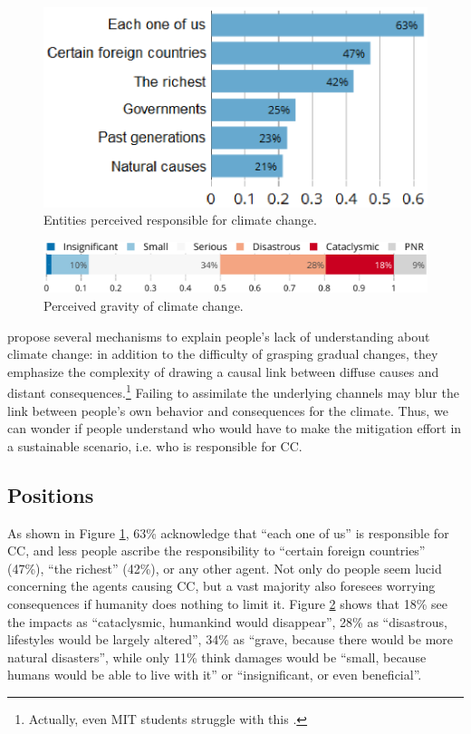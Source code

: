\documentclass[english,5p,authoryear]{elsarticle}
\begin{document}


\begin{figure}[!htbp]
\centering
\includegraphics[width=0.75\columnwidth]{Images_EPS/CC_responsiblec.eps}
\caption{Entities perceived responsible for climate change.}
\label{fig:responsible}
\end{figure}

\begin{figure}[t]
\centering
\includegraphics[width=\columnwidth]{Images_EPS/CC_effects_nolegend.eps}
\caption{Perceived gravity of climate change.}
\label{fig:gravity}
\end{figure}

\citet{millner_beliefs_2016} propose several mechanisms to explain people's lack of understanding about climate change: in addition to the difficulty of grasping gradual changes, they emphasize the complexity of drawing a causal link between diffuse causes and distant consequences.\footnote{Actually, even MIT students struggle with this \citep{sterman_risk_2008}.} Failing to assimilate the underlying channels may blur the link between people's own behavior and consequences for the climate. Thus, we can wonder if people understand who would have to make the mitigation effort in a sustainable scenario, i.e. who is responsible for CC.


    \subsection{Positions\label{subsec:opinions}}
As shown in Figure \ref{fig:responsible}, 63\% acknowledge that ``each one of us'' is responsible for CC, and less people ascribe the responsibility to ``certain foreign countries'' (47\%), ``the richest'' (42\%), or any other agent.  Not only do people seem lucid concerning the agents causing CC, but a vast majority also foresees worrying consequences if humanity does nothing to limit it. Figure \ref{fig:gravity} shows that 18\% see the impacts as ``cataclysmic, humankind would disappear'', 28\% as ``disastrous, lifestyles would be largely altered'', 34\% as ``grave, because there would be more natural disasters'', while only 11\% think damages would be ``small, because humans would be able to live with it'' or ``insignificant, or even beneficial''. 
\end{document}
